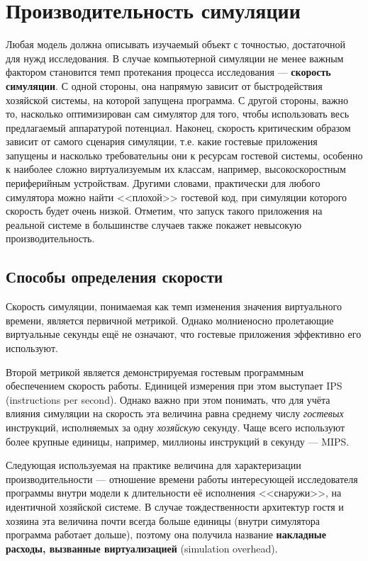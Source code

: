 \section{Производительность симуляции}

Любая модель должна описывать изучаемый объект с точностью, достаточной для нужд исследования. В случае компьютерной симуляции не менее важным фактором становится темп протекания процесса исследования --- \textbf{скорость симуляции}. С одной стороны, она напрямую зависит от быстродействия хозяйской системы, на которой запущена программа. С другой стороны, важно то, насколько оптимизирован сам симулятор для того, чтобы использовать весь предлагаемый аппаратурой потенциал. Наконец, скорость критическим образом зависит от самого сценария симуляции, т.е. какие гостевые приложения запущены и насколько требовательны они к ресурсам гостевой системы, особенно к наиболее сложно виртуализуемым их классам, например, высокоскоростным периферийным устройствам. Другими словами, практически для любого симулятора можно найти <<плохой>> гостевой код, при симуляции которого скорость будет очень низкой. Отметим, что запуск такого приложения на реальной системе в большинстве случаев также покажет невысокую производительность.

\subsection{Способы определения скорости}

Скорость симуляции, понимаемая как темп изменения значения виртуального времени, является первичной метрикой. Однако молниеносно пролетающие виртуальные секунды ещё не означают, что гостевые приложения эффективно его используют. 

Второй метрикой является демонстрируемая гостевым программным обеспечением скорость работы. Единицей измерения при этом выступает IPS (\abbr instructions per second). Однако важно при этом понимать, что для учёта влияния симуляции на скорость эта величина равна среднему числу \emph{гостевых} инструкций, исполняемых за одну \emph{хозяйскую} секунду. Чаще всего используют более крупные единицы, например, миллионы инструкций в секунду --- MIPS.

Следующая используемая на практике величина для характеризации производительности --- отношение времени работы интересующей исследователя программы внутри модели к длительности её исполнения <<снаружи>>, на идентичной хозяйской системе. В случае тождественности архитектур гостя и хозяина эта величина почти всегда больше единицы (внутри симулятора программа работает дольше), поэтому она получила название \textbf{накладные расходы, вызванные виртуализацией} (\abbr simulation overhead). 

